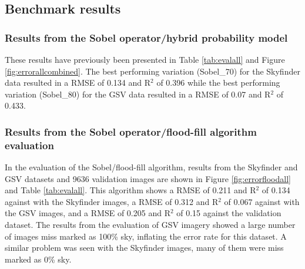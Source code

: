 \documentclass[final,3p,times,authoryear]{elsarticle}
\begin{document}

\subsection{Benchmark results}
\subsubsection{Results from the \cite{Wang2015a} Sobel operator/hybrid probability model}
These results have previously been presented in Table \ref{tab:evalall} and Figure \ref{fig:errorallcombined}. The best performing variation (Sobel\_70) for the Skyfinder data resulted in a RMSE of 0.134 and R$^{2}$ of 0.396 while the best performing variation (Sobel\_80) for the GSV data resulted in a RMSE of 0.07 and R$^{2}$ of 0.433.

\subsubsection{Results from the \cite{Middel2018} Sobel operator/flood-fill algorithm evaluation}\label{sec:resultsflood}
In the evaluation of the Sobel/flood-fill algorithm, results from the Skyfinder and GSV datasets and 9636 validation images are shown in Figure \ref{fig:errorfloodall} and Table \ref{tab:evalall}. This algorithm shows a RMSE of 0.211 and R$^{2}$ of 0.134 against with the Skyfinder images, a RMSE of 0.312 and R$^{2}$ of 0.067 against with the GSV images, and a RMSE of 0.205 and R$^{2}$ of 0.15 against the validation dataset. The results from the evaluation of GSV imagery showed a large number of images miss marked as 100\% sky, inflating the error rate for this dataset. A similar problem was seen with the Skyfinder images, many of them were miss marked as 0\% sky.
\end{document}
